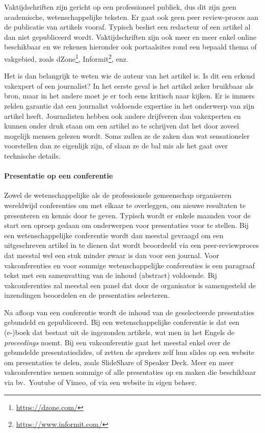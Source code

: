 Vaktijdschriften zijn gericht op een professioneel publiek, dus dit zijn geen academische, wetenschappelijke teksten. Er gaat ook geen peer review-proces aan de publicatie van artikels vooraf. Typisch beslist een redacteur of een artikel al dan niet gepubliceerd wordt. Vaktijdschriften zijn ook meer en meer enkel online beschikbaar en we rekenen hieronder ook portaalsites rond een bepaald thema of vakgebied, zoals dZone\footnote{\url{https://dzone.com/}}, Informit\footnote{\url{https://www.informit.com/}}, enz.

Het is dan belangrijk te weten wie de auteur van het artikel is. Is dit een erkend vakexpert of een journalist? In het eerste geval is het artikel zeker bruikbaar als bron, maar in het andere moet je er toch eens kritisch naar kijken. Er is immers zelden garantie dat een journalist voldoende expertise in het onderwerp van zijn artikel heeft. Journalisten hebben ook andere drijfveren dan vakexperten en kunnen onder druk staan om een artikel zo te schrijven dat het door zoveel mogelijk mensen gelezen wordt. Soms zullen ze de zaken dan wat sensationeler voorstellen dan ze eigenlijk zijn, of slaan ze de bal mis als het gaat over technische details.

\paragraph{Presentatie op een conferentie}

Zowel de wetenschappelijke als de professionele gemeenschap organiseren wereldwijd conferenties om met elkaar te overleggen, om nieuwe resultaten te presenteren en kennis door te geven. Typisch wordt er enkele maanden voor de start een oproep gedaan om onderwerpen voor presentaties voor te stellen. Bij een wetenschappelijke conferentie wordt dan meestal gevraagd om een uitgeschreven artikel in te dienen dat wordt beoordeeld via een peer-reviewproces dat meestal wel een stuk minder zwaar is dan voor een journal. Voor vakconferenties en voor sommige wetenschappelijke conferenties is een paragraaf tekst met een samenvatting van de inhoud (abstract) voldoende. Bij vakconferenties zal meestal een panel dat door de organisator is samengesteld de inzendingen beoordelen en de presentaties selecteren.

Na afloop van een conferentie wordt de inhoud van de geselecteerde presentaties gebundeld en gepubliceerd. Bij een wetenschappelijke conferentie is dat een (e-)boek dat bestaat uit de ingezonden artikels, wat men in het Engels de \emph{proceedings} noemt. Bij een vakconferentie gaat het meestal enkel over de gebundelde presentatieslides, of zetten de sprekers zelf hun slides op een website om presentaties te delen, zoals SlideShare of Speaker Deck. Meer en meer vakconferenties nemen sommige of alle presentaties op en maken die beschikbaar via bv.~Youtube of Vimeo, of via een website in eigen beheer.

